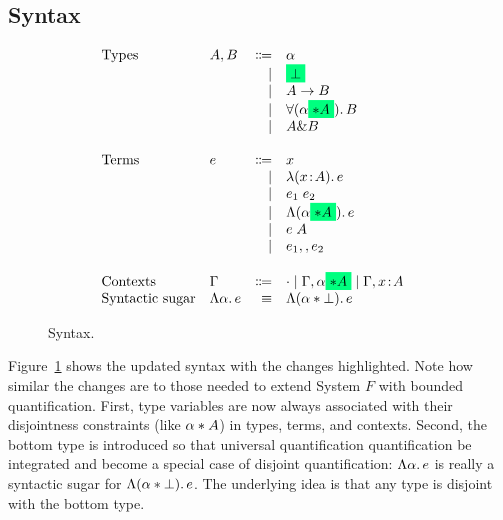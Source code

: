 \subsection{Syntax}

\begin{figure}[h]
  \[
    \begin{array}{l}
      \begin{array}{llrll}
        \text{Types}
        & A, B & \Coloneqq & \alpha                  & \\
        &      & \mid & \highlight {$\bot$}          & \\
        &      & \mid & A \to B                      & \\
        &      & \mid & \for {(\alpha \highlight {$\disjoint A$})} B  & \\
        &      & \mid & A \inter B                   & \\

        \\
        \text{Terms}
        & e & \Coloneqq & x                        & \\
        &   & \mid & \lam {(x \hast A)} e          & \\
        &   & \mid & \app {e_1} {e_2}              & \\
        &   & \mid & \blam {(\alpha \highlight {$\disjoint A$})} e  & \\
        &   & \mid & \tapp e A                     & \\
        &   & \mid & e_1 \mergeop e_2              & \\

        \\
        \text{Contexts}
        & \Gamma & \Coloneqq & \cdot
                   \mid \Gamma, \alpha \highlight {$\disjoint A$}
                   \mid \Gamma, x \hast A  & \\

        \text{Syntactic sugar} & \blam {\alpha} e & \equiv & \blam {(\alpha \disjoint \bot)} e & \\
      \end{array}
    \end{array}
  \]

  \label{fig:syntax} \caption{Syntax.}
\end{figure}

Figure~\ref{fig:syntax} shows the updated syntax with the changes highlighted.
Note how similar the changes are to those needed to extend System $F$ with
bounded quantification. First, type variables are now always associated with
their disjointness constraints (like $\alpha * A$) in types, terms, and
contexts. Second, the bottom type is introduced so that universal quantification
quantification be integrated and become a special case of disjoint
quantification: $\Lambda \alpha.\, e$ is really a syntactic sugar for $\Lambda (\alpha * \bot).\, e$. The underlying idea is that any type is disjoint
with the bottom type.

